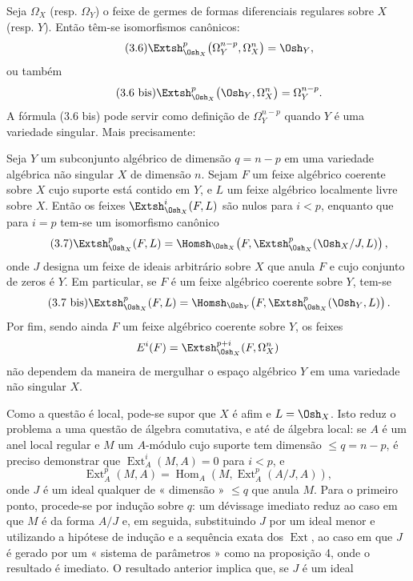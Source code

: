 Seja $\Omega_X$ (resp. $\Omega_Y$) o feixe de germes de formas
diferenciais regulares sobre $X$ (resp. $Y$). Então têm-se isomorfismos
canônicos:
\begin{equation}\tag{3.6}
  \Extsh_{\Osh_X}^{p}\bigl(\Omega_Y^{n-p},\Omega_X^{n}\bigr)=\Osh_Y,
\end{equation}
ou também
\begin{equation}\tag{3.6 bis}
  \Extsh_{\Osh_X}^{p}\bigl(\Osh_Y,\Omega_X^{n}\bigr)=\Omega_Y^{n-p}.
\end{equation}
A fórmula (3.6 bis) pode servir como definição de $\Omega_Y^{n-p}$ quando $Y$
é uma variedade singular. Mais precisamente:

 Seja $Y$ um subconjunto algébrico de dimensão
$q=n-p$ em uma variedade algébrica não singular $X$ de dimensão $n$. Sejam
$F$ um feixe algébrico coerente sobre $X$ cujo suporte está contido em $Y$, e $L$
um feixe algébrico localmente livre sobre $X$. Então os feixes
$\Extsh_{\Osh_X}^{i}(F,L)$ são nulos para $i<p$, enquanto que para $i=p$ tem-se um
isomorfismo canônico
\begin{equation}\tag{3.7}
  \Extsh_{\Osh_X}^{p}(F,L)
  =\Homsh_{\Osh_X}\!\left(F,
  \Extsh_{\Osh_X}^{p}(\Osh_X/J,L)\right),
\end{equation}
onde $J$ designa um feixe de ideais arbitrário sobre $X$ que anula $F$ e cujo
conjunto de zeros é $Y$. Em particular, se $F$ é um feixe algébrico
coerente sobre $Y$, tem-se
\begin{equation}\tag{3.7 bis}
  \Extsh_{\Osh_X}^{p}(F,L)
  =\Homsh_{\Osh_Y}\!\left(F,\Extsh_{\Osh_X}^{p}(\Osh_Y,L)\right).
\end{equation}
Por fim, sendo ainda $F$ um feixe algébrico coerente sobre $Y$, os feixes
\[
  E^{i}(F)=\Extsh_{\Osh_X}^{p+i}(F,\Omega_X^{n})
\]
não dependem da maneira de mergulhar o espaço algébrico $Y$ em uma variedade
não singular $X$.

Como a questão é local, pode-se supor que $X$ é afim e $L=\Osh_X$. Isto reduz
o problema a uma questão de álgebra comutativa, e até de álgebra local: se $A$ é um
anel local regular e $M$ um $A$-módulo cujo suporte tem dimensão
$\leq q=n-p$, é preciso demonstrar que $\operatorname{Ext}_{A}^{i}(M,A)=0$ para $i<p$, e
\[
  \operatorname{Ext}_{A}^{p}(M,A)
  =\operatorname{Hom}_{A}\!\left(M,\operatorname{Ext}_{A}^{p}(A/J,A)\right),
\]
onde $J$ é um ideal qualquer de « dimensão » $\leq q$ que anula $M$. Para o
primeiro ponto, procede-se por indução sobre $q$: um dévissage imediato reduz
ao caso em que $M$ é da forma $A/J$ e, em seguida, substituindo $J$ por um ideal menor
e utilizando a hipótese de indução e a sequência exata dos
$\operatorname{Ext}$, ao caso em que $J$ é gerado por um « sistema de parâmetros »
como na proposição 4, onde o resultado é imediato. O resultado
anterior implica que, se $J$ é um ideal


